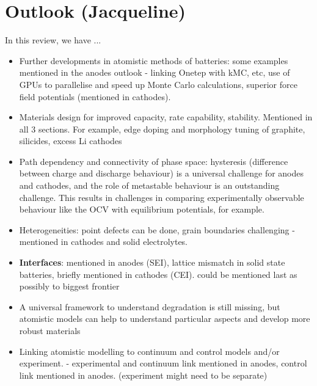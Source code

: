\documentclass[../main.tex]{subfiles}
\begin{document}
\section{Outlook (Jacqueline)}
In this review, we have ...


\begin{itemize}

    \item Further developments in atomistic methods of batteries: some examples mentioned in the anodes outlook - linking Onetep with kMC, etc, use of GPUs to parallelise and speed up Monte Carlo calculations, superior force field potentials (mentioned in cathodes).
    \item Materials design for improved capacity, rate capability, stability. Mentioned in all 3 sections. For example, edge doping and morphology tuning of graphite, silicides, excess Li cathodes
    \item Path dependency and connectivity of phase space: hysteresis (difference between charge and discharge behaviour) is a universal challenge for anodes and cathodes, and the role of metastable behaviour is an outstanding challenge. This results in challenges in comparing experimentally observable behaviour like the OCV with equilibrium potentials, for example. 
    \item Heterogeneities: point defects can be done, grain boundaries challenging - mentioned in cathodes and solid electrolytes.
    \item \textbf{Interfaces}: mentioned in anodes (SEI), lattice mismatch in solid state batteries, briefly mentioned in cathodes (CEI). could be mentioned last as possibly to biggest frontier
    \item A universal framework to understand degradation is still missing, but atomistic models can help to understand particular aspects and develop more robust materials
    \item Linking atomistic modelling to continuum and control models and/or experiment. - experimental and continuum link mentioned in anodes, control link mentioned in anodes. (experiment might need to be separate)

\end{itemize}
\end{document}

